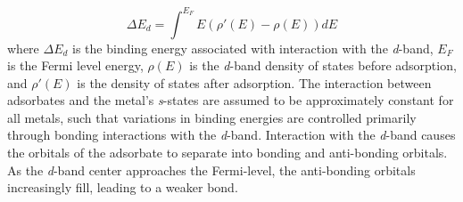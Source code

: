 \begin{equation}
    \Delta E_d = \int^{E_F} E(\rho'(E) - \rho(E))dE
    \label{eq:d_band}
\end{equation}
where $\Delta E_d$ is the binding energy associated with interaction with the \textit{d}-band, $E_F$ is the Fermi level energy, $\rho(E)$ is the \textit{d}-band density of states before adsorption, and $\rho'(E)$ is the density of states after adsorption. The interaction between adsorbates and the metal's \textit{s}-states are assumed to be approximately constant for all metals, such that variations in binding energies are controlled primarily through bonding interactions with the \textit{d}-band. Interaction with the \textit{d}-band causes the orbitals of the adsorbate to separate into bonding and anti-bonding orbitals. As the \textit{d}-band center approaches the Fermi-level, the anti-bonding orbitals increasingly fill, leading to a weaker bond.

